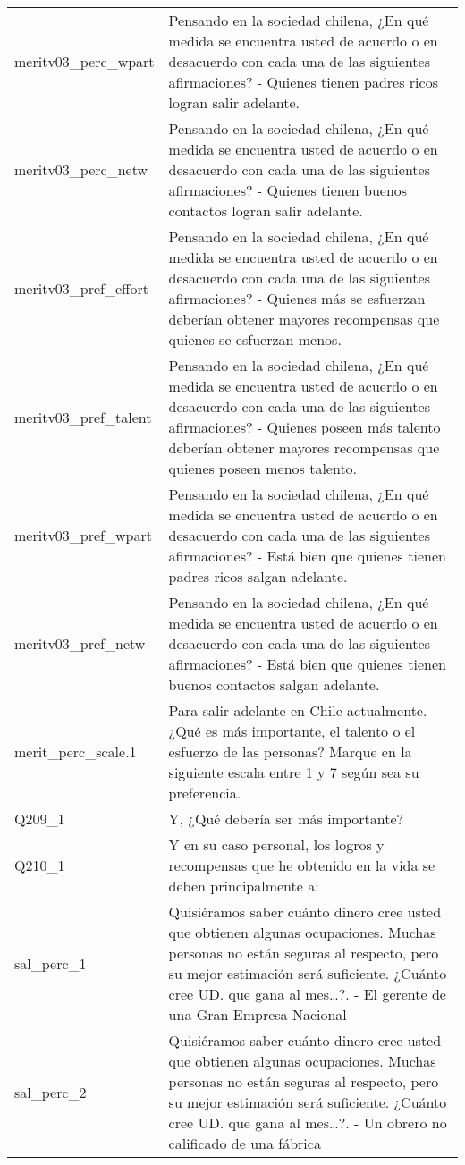 \documentclass[
  10,
  landscape,
  legalpaper]{article}
\begin{document}
\begin{table}
{\begin{tabular}{l>{\raggedright\arraybackslash}p{10cm}}
meritv03\_perc\_wpart & Pensando en la sociedad chilena, ¿En qué medida se encuentra usted de acuerdo o en desacuerdo con cada una de las siguientes afirmaciones? - Quienes tienen padres ricos logran salir adelante.\\
meritv03\_perc\_netw & Pensando en la sociedad chilena, ¿En qué medida se encuentra usted de acuerdo o en desacuerdo con cada una de las siguientes afirmaciones? - Quienes tienen buenos contactos logran salir adelante.\\
meritv03\_pref\_effort & Pensando en la sociedad chilena, ¿En qué medida se encuentra usted de acuerdo o en desacuerdo con cada una de las siguientes afirmaciones? - Quienes más se esfuerzan deberían obtener mayores recompensas que quienes se esfuerzan menos.\\
meritv03\_pref\_talent & Pensando en la sociedad chilena, ¿En qué medida se encuentra usted de acuerdo o en desacuerdo con cada una de las siguientes afirmaciones? - Quienes poseen más talento deberían obtener mayores recompensas que quienes poseen menos talento.\\
\addlinespace
meritv03\_pref\_wpart & Pensando en la sociedad chilena, ¿En qué medida se encuentra usted de acuerdo o en desacuerdo con cada una de las siguientes afirmaciones? - Está bien que quienes tienen padres ricos salgan adelante.\\
meritv03\_pref\_netw & Pensando en la sociedad chilena, ¿En qué medida se encuentra usted de acuerdo o en desacuerdo con cada una de las siguientes afirmaciones? - Está bien que quienes tienen buenos contactos salgan adelante.\\
merit\_perc\_scale.1 & Para salir adelante en Chile actualmente. ¿Qué es más importante, el talento o el esfuerzo de las personas? Marque en la siguiente escala entre 1 y 7 según sea su preferencia.\\
Q209\_1 & Y, ¿Qué debería ser más importante?\\
Q210\_1 & Y en su caso personal, los logros y recompensas que he obtenido en la vida se deben principalmente a:\\
\addlinespace
sal\_perc\_1 & Quisiéramos saber cuánto dinero cree usted que obtienen algunas ocupaciones. Muchas personas no están seguras al respecto, pero su mejor estimación será suficiente.  ¿Cuánto cree UD. que gana al mes…?. - El gerente de una Gran Empresa Nacional\\
sal\_perc\_2 & Quisiéramos saber cuánto dinero cree usted que obtienen algunas ocupaciones. Muchas personas no están seguras al respecto, pero su mejor estimación será suficiente.  ¿Cuánto cree UD. que gana al mes…?. - Un obrero no calificado de una fábrica\\

\end{tabular}}
\end{table}
\end{document}
